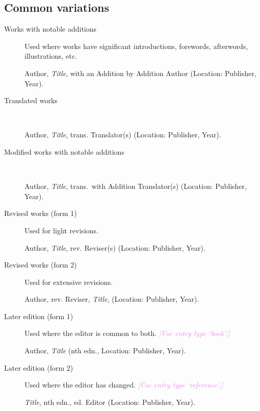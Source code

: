 \documentclass[extrafontsizes,11pt,a4paper,oneside]{memoir}
\newcommand*{\lit}[1]{\textsf{#1}}
\newcommand*{\code}[1]{`\textsf{#1}'}
\newcommand*{\aside}[1]{\textcolor{violet}{\emph{[#1]}}}
\begin{document}
\subsection{Common variations}

\begin{description}
  \item[Works with notable additions] Used where works have significant introductions, forewords, afterwords, illustrations, etc.\par
  Author, \emph{Title}, \lit{with an} Addition \lit{by} Addition Author (Location: Publisher, Year).
  \\
  
  \item[Translated works]~\par
  Author, \emph{Title}, \lit{trans.} Translator(s) (Location: Publisher, Year).
  \\
  
  \item[Modified works with notable additions]~\par
  Author, \emph{Title}, \lit{trans.\ with} Addition Translator(s) (Location: Publisher, Year).
  \\
  
  \item[Revised works (form 1)] Used for light revisions.
  \par Author, \emph{Title}, \lit{rev.} Reviser(s) (Location: Publisher, Year).
  
  \item[Revised works (form 2)] Used for extensive revisions.
  \par Author, \lit{rev.} Reviser, \emph{Title}, (Location: Publisher, Year).
  
  \item[Later edition (form 1)] Used where the editor is common to both. \aside{Use entry type \code{book}.}
  \par Author, \emph{Title} (nth \lit{edn.}, Location: Publisher, Year).
  \\
  
  \item[Later edition (form 2)] Used where the editor has changed. \aside{Use entry type \code{reference}.}
  \par \emph{Title}, nth \lit{edn.}, \lit{ed.} Editor (Location: Publisher, Year).
  \\
  

\end{description}
\end{document}
